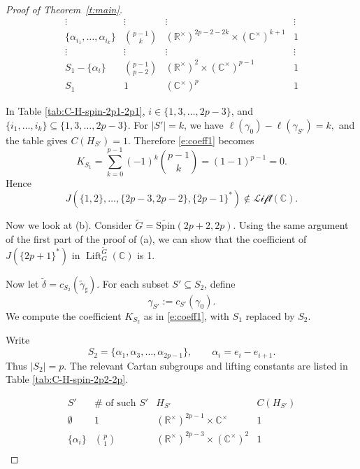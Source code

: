 \documentclass{amsart}
\DeclareMathOperator{\Lift}{Lift}
\newcommand{\LLift}{\mathscr{Lift}}
\newcommand{\LiftC}{\Lift_G^{\tu G}(\bbC)}
\newcommand{\bbC}{{\mathbb{C}}}
\newcommand{\bbR}{{\mathbb R}}
\newcommand{\Spin}{{\mathrm{Spin}}}
\theoremstyle{definition}
\newcommand{\tu}{\widetilde}
\begin{document}
\begin{proof}[Proof of Theorem~\ref{t:main}]
\begin{table}[!htbp]
\[\begin{array}{c|c|c|c}
\vdots
&
\vdots
&
\vdots
&
\vdots
\\

\{\alpha_{i_1},\ldots,\alpha_{i_k}\}
&
{p-1\choose k}
&
(\bbR^\times)^{2p-2-2k}\times(\bbC^\times)^{k+1}
&
1
\\

\vdots
&
\vdots
&
\vdots
&
\vdots
\\

S_1-\{\alpha_i\}
&
{p-1\choose p-2}
&
(\bbR^\times)^2\times(\bbC^\times)^{p-1}
&
1
\\

S_1
&
1
&
(\bbC^\times)^p
&
1
\end{array}
\]
\caption{The Cartan subgroups \(H_{S'}\) and lifting constants \(C(H_{S'})\) for \(S'\subseteq S_1\) in the case \(G=\Spin(2p+1,2p-1)\).}
\label{tab:C-H-spin-2p1-2p1}
\end{table}

In Table \ref{tab:C-H-spin-2p1-2p1},  \(i\in\{1,3,\ldots,2p-3\}\), and $\{i_1,\ldots,i_k\}\subseteq \{1,3,\ldots,2p-3\}$.
For \(|S'|=k\), we have $
\ell(\gamma_0)-\ell(\gamma_{S'})=k,$
and the table gives
$C(H_{S'})=1.$
Therefore \eqref{e:coeff1} becomes
\[
K_{S_1}
=
\sum_{k=0}^{p-1}
(-1)^k {p-1\choose k}
=
(1-1)^{p-1}
=
0.
\]
Hence
\[
J(\{1,2\},\ldots,\{2p-3,2p-2\},\{2p-1\}^*)
\notin \LLift(\bbC).
\]

Now we look at (b).  Consider $\tu G=\tu\Spin (2p+2,2p)$. 
Using the same argument of the first part of the proof of (a), we can show  that 
the coefficient of $J(\{2p+1\}^*)$ in $\LiftC$ is 1. 



Now let $\tu\delta=c_{S_2}(\tu\gamma_\sharp).$
For each subset \(S'\subseteq S_2\), define
\[
\gamma_{S'}:=c_{S'}(\gamma_0).
\]
We compute the coefficient \(K_{S_2}\) as in \eqref{e:coeff1}, with
\(S_1\) replaced by \(S_2\).

Write
\[
S_2=\{\alpha_1,\alpha_3,\ldots,\alpha_{2p-1}\},
\qquad
\alpha_i=e_i-e_{i+1}.
\]
Thus \(|S_2|=p\). The relevant Cartan subgroups and lifting constants are
listed in Table \ref{tab:C-H-spin-2p2-2p}.

\begin{table}[!htbp]
\centering
\renewcommand{\arraystretch}{1.35}
\[
\begin{array}{c|c|c|c}
S' & \#\text{ of such }S' & H_{S'} & C(H_{S'}) \\
\hline
\emptyset
&
1
&
(\bbR^\times)^{2p-1}\times \bbC^\times
&
1
\\

\{\alpha_i\}
&
{p\choose 1}
&
(\bbR^\times)^{2p-3}\times(\bbC^\times)^2
&
1
\\


\end{array}\]
\end{table}
\end{proof}
\end{document}
